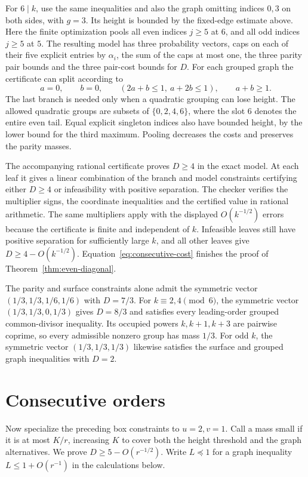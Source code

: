 \documentclass[11pt,reqno]{amsart}
\begin{document}
For \(6\mid k\), use the same inequalities and also the graph omitting
indices \(0,3\) on both sides, with \(g=3\). Its height is bounded by
the fixed-edge estimate above. Here the finite optimization pools all
even indices \(j\ge5\) at \(6\), and all odd indices \(j\ge5\) at \(5\).
The resulting model has three probability vectors, caps on each of
their five explicit entries by \(\alpha_i\), the sum of the caps
at most one, the three parity pair bounds and the three pair-cost
bounds for \(D\). For each grouped graph the certificate can split
according to
\[
 a=0,\qquad b=0,\qquad
 (2a+b\le1,\ a+2b\le1),\qquad a+b\ge1 .
\]
The last branch is needed only when a quadratic grouping can lose
height. The allowed quadratic groups are subsets of \(\{0,2,4,6\}\),
where the slot \(6\) denotes the entire even tail. Equal
explicit singleton indices also have bounded height, by the
lower bound for the third maximum. Pooling decreases the
costs and preserves the parity masses.

The accompanying rational certificate proves \(D\ge4\) in the
exact model. At each leaf it gives a linear combination of the
branch and model constraints certifying either \(D\ge4\) or
infeasibility with positive separation. The checker verifies the
multiplier signs, the coordinate inequalities and the certified
value in rational arithmetic. The same multipliers apply with the
displayed \(O(k^{-1/2})\) errors because the certificate is finite
and independent of \(k\). Infeasible leaves still have positive
separation for sufficiently large \(k\), and all other leaves give
\(D\ge4-O(k^{-1/2})\).
Equation~\eqref{eq:consecutive-cost} finishes the proof of
Theorem~\ref{thm:even-diagonal}.

The parity and surface constraints alone admit the symmetric
vector \((1/3,1/3,1/6,1/6)\) with \(D=7/3\).
For \(k\equiv2,4\pmod6\), the symmetric vector
\((1/3,1/3,0,1/3)\) gives \(D=8/3\) and satisfies every
leading-order grouped common-divisor inequality. Its occupied
powers \(k,k+1,k+3\) are pairwise coprime, so every admissible
nonzero group has mass \(1/3\).
For odd \(k\), the symmetric vector \((1/3,1/3,1/3)\) likewise
satisfies the surface and grouped graph inequalities with \(D=2\).

\section{Consecutive orders}
Now specialize the preceding box constraints to \(u=2,v=1\).
Call a mass small if it is at most \(K/r\), increasing \(K\) to
cover both the height threshold and the graph alternatives.
We prove \(D\ge5-O(r^{-1/2})\). Write \(L\preceq1\) for a
graph inequality \(L\le1+O(r^{-1})\) in the calculations below.
\end{document}

